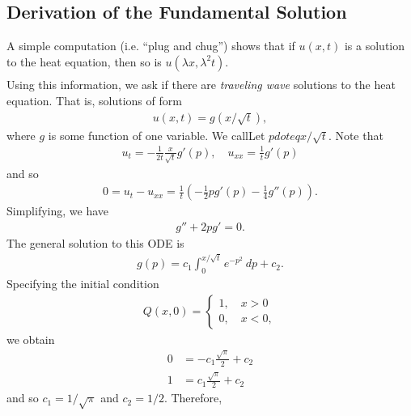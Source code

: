 \subsection{Derivation of the Fundamental Solution}
A simple computation (i.e. ``plug and chug'') shows that if $u(x,t)$ is a solution to the heat equation, then
so is $u(\lambda x, \lambda^{2} t)$.
\begin{equation*}
\begin{split}
\end{split}
\end{equation*}
Using this information, we ask if there are \emph{traveling wave} solutions to
the heat equation. That is, solutions of form
\begin{equation*}
\begin{split}
	u(x,t) = g(x/\sqrt{t}),
\end{split}
\end{equation*}
where $g$ is some function of one variable. We callLet $p doteq x / \sqrt{t}$.
Note that
\begin{equation*}
\begin{split}
	u_{t} = -\frac{1}{2t} \frac{x}{\sqrt{t}}g'(p), \quad u_{xx} =
	\frac{1}{t}g'(p)
\end{split}
\end{equation*}
and so
\begin{equation*}
\begin{split}
	0 = u_{t} - u_{xx} = \frac{1}{t}\left( -\frac{1}{2}pg'(p) -
	\frac{1}{4} g''(p) \right).
\end{split}
\end{equation*}
Simplifying, we have
\begin{equation*}
\begin{split}
	g'' + 2pg' = 0.
\end{split}
\end{equation*}
The general solution to this ODE is
\begin{equation*}
\begin{split}
	g(p) = c_{1} \int_{0}^{x / \sqrt{t}} e^{-p^{2}} \ dp + c_{2}.
\end{split}
\end{equation*}
Specifying the initial condition
\begin{equation*}
\begin{split}
	Q(x,0) = \begin{cases}
		1, \quad x > 0 \\
		0, \quad x < 0,
	\end{cases}
\end{split}
\end{equation*}
we obtain
\begin{equation*}
\begin{split}
	0 & =  -c_{1} \frac{\sqrt{\pi}}{2} + c_{2}
	\\
	1 & = c_{1} \frac{\sqrt{\pi}}{2} + c_{2}
\end{split}
\end{equation*}
and so $c_{1} = 1/\sqrt{\pi}$ and $c_{2} = 1/2$.
Therefore,


